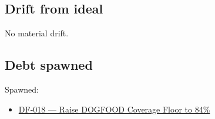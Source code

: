 \subsection{Drift from ideal}\label{record-079-drift-from-ideal}

No material drift.

\subsection{Debt spawned}\label{record-079-debt-spawned}

Spawned:

\begin{itemize}
\tightlist
\item
  \href{https://github.com/flyingrobots/bijou/blob/cbd70612140e7a450d764b3c7be1c6af878b99bc/docs/design/DF-018-raise-dogfood-coverage-floor-to-84-percent.md}{DF-018 --- Raise DOGFOOD Coverage Floor to 84\%}
\end{itemize}

